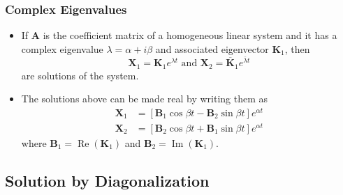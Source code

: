 \documentclass{article}
\renewcommand{\Im}{\operatorname{Im}}
\renewcommand{\Re}{\operatorname{Re}}
\begin{document}
\subsubsection{Complex Eigenvalues}

\begin{itemize}
  \item If $\mathbf{A}$ is the coefficient matrix of a homogeneous linear system and it has a complex eigenvalue $\lambda = \alpha + i \beta$ and associated eigenvector $\mathbf{K}_1$, then \[\mathbf{X}_1 = \mathbf{K}_1 e^{\lambda t} \text{ and } \mathbf{X}_2 = \overline{\mathbf{K}}_1 e^{\overline{\lambda} t}\] are solutions of the system.

  \item The solutions above can be made real by writing them as \begin{align*}
          \mathbf{X}_1 & = [\mathbf{B}_1 \cos \beta t - \mathbf{B}_2 \sin \beta t] e^{\alpha t} \\
          \mathbf{X}_2 & = [\mathbf{B}_2 \cos \beta t + \mathbf{B}_1 \sin \beta t] e^{\alpha t}
        \end{align*} where $\mathbf{B}_1 = \Re (\mathbf{K}_1)$ and $\mathbf{B}_2 = \Im(\mathbf{K}_1)$.
\end{itemize}

\subsection{Solution by Diagonalization}
\end{document}
